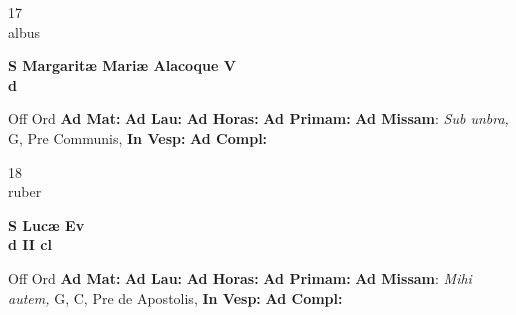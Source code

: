\documentclass[10pt, openany]{book}
\begin{document}
    \begin{center}
        \begin{minipage}{3.5in}
            \vspace{2em}
            \begin{minipage}{0.5in}
                {\Huge 17} \\
                {\normalsize albus}
            \end{minipage}
            \begin{minipage}{3.0in}
                \textbf{ \large S Margaritæ Mariæ Alacoque V \\
                \textnormal{\normalsize d}}

            \end{minipage}
            \begin{justify}Off Ord
                \textbf{Ad Mat: }
                \textbf{Ad Lau: }
                \textbf{Ad Horas: }
                \textbf{Ad Primam: }\textbf{Ad Missam}: \textit{Sub unbra,} G, Pre Communis, 
                \textbf{In Vesp: }
                \textbf{Ad Compl: }
            \end{justify}
        \end{minipage}
    \end{center}

    \begin{center}
        \begin{minipage}{3.5in}
            \vspace{2em}
            \begin{minipage}{0.5in}
                {\Huge 18} \\
                {\normalsize ruber}
            \end{minipage}
            \begin{minipage}{3.0in}
                \textbf{ \large S Lucæ Ev \\
                \textnormal{\normalsize d II cl}}

            \end{minipage}
            \begin{justify}Off Ord
                \textbf{Ad Mat: }
                \textbf{Ad Lau: }
                \textbf{Ad Horas: }
                \textbf{Ad Primam: }\textbf{Ad Missam}: \textit{Mihi autem,} G, C, Pre de Apostolis, 
                \textbf{In Vesp: }
                \textbf{Ad Compl: }
            \end{justify}
        \end{minipage}
    \end{center}
\end{document}
